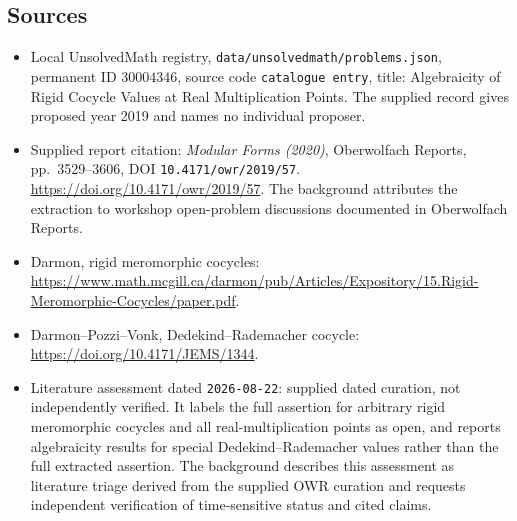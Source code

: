 \documentclass[11pt]{article}
\begin{document}
\subsection{Sources}
\begin{itemize}
\item Local UnsolvedMath registry, \texttt{data/unsolvedmath/problems.json}, permanent ID \(30004346\), source code \texttt{catalogue entry}, title: Algebraicity of Rigid Cocycle Values at Real Multiplication Points. The supplied record gives proposed year 2019 and names no individual proposer.
\item Supplied report citation: \emph{Modular Forms (2020)}, Oberwolfach Reports, pp.\ 3529--3606, DOI \texttt{10.4171/owr/2019/57}. \url{https://doi.org/10.4171/owr/2019/57}. The background attributes the extraction to workshop open-problem discussions documented in Oberwolfach Reports.
\item Darmon, rigid meromorphic cocycles: \url{https://www.math.mcgill.ca/darmon/pub/Articles/Expository/15.Rigid-Meromorphic-Cocycles/paper.pdf}.
\item Darmon--Pozzi--Vonk, Dedekind--Rademacher cocycle: \url{https://doi.org/10.4171/JEMS/1344}.
\item Literature assessment dated \texttt{2026-08-22}: supplied dated curation, not independently verified. It labels the full assertion for arbitrary rigid meromorphic cocycles and all real-multiplication points as open, and reports algebraicity results for special Dedekind--Rademacher values rather than the full extracted assertion. The background describes this assessment as literature triage derived from the supplied OWR curation and requests independent verification of time-sensitive status and cited claims.
\end{itemize}
\end{document}
